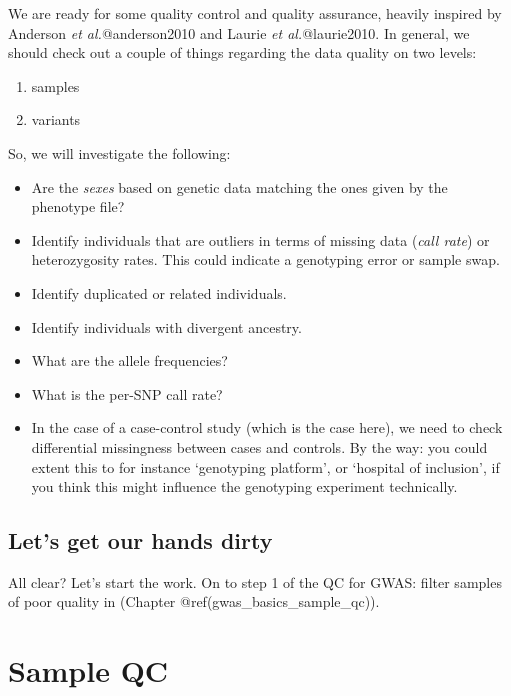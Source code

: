 \documentclass[
]{book}
\providecommand{\tightlist}{%
  \setlength{\itemsep}{0pt}\setlength{\parskip}{0pt}}
\begin{document}
We are ready for some quality control and quality assurance, heavily inspired by Anderson \emph{et al.}@anderson2010 and Laurie \emph{et al.}@laurie2010. In general, we should check out a couple of things regarding the data quality on two levels:

\begin{enumerate}
\def\labelenumi{\arabic{enumi})}
\tightlist
\item
  samples
\item
  variants
\end{enumerate}

So, we will investigate the following:

\begin{itemize}
\tightlist
\item
  Are the \emph{sexes} based on genetic data matching the ones given by the phenotype file?
\item
  Identify individuals that are outliers in terms of missing data (\emph{call rate}) or heterozygosity rates. This could indicate a genotyping error or sample swap.
\item
  Identify duplicated or related individuals.
\item
  Identify individuals with divergent ancestry.
\item
  What are the allele frequencies?
\item
  What is the per-SNP call rate?
\item
  In the case of a case-control study (which is the case here), we need to check differential missingness between cases and controls. By the way: you could extent this to for instance `genotyping platform', or `hospital of inclusion', if you think this might influence the genotyping experiment technically.
\end{itemize}

\hypertarget{lets-get-our-hands-dirty}{%
\section{Let's get our hands dirty}\label{lets-get-our-hands-dirty}}

All clear? Let's start the work. On to step 1 of the QC for GWAS: filter samples of poor quality in (Chapter @ref(gwas\_basics\_sample\_qc)).

\hypertarget{sample-qc}{%
\chapter{Sample QC}\label{sample-qc}}
\end{document}
